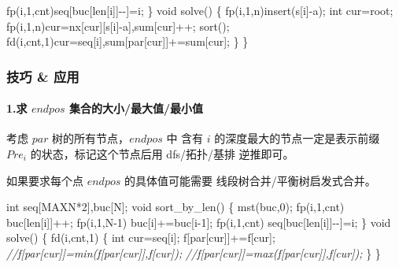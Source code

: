 \documentclass[
]{article}
\newenvironment{Shaded}{}{}
\newcommand{\CharTok}[1]{\textcolor[rgb]{0.25,0.44,0.63}{#1}}
\newcommand{\CommentTok}[1]{\textcolor[rgb]{0.38,0.63,0.69}{\textit{#1}}}
\newcommand{\DataTypeTok}[1]{\textcolor[rgb]{0.56,0.13,0.00}{#1}}
\newcommand{\DecValTok}[1]{\textcolor[rgb]{0.25,0.63,0.44}{#1}}
\newcommand{\NormalTok}[1]{#1}
\begin{document}
\begin{Shaded}
\begin{Highlighting}[]
\NormalTok{        fp(i,}\DecValTok{1}\NormalTok{,cnt)seq[buc[len[i]]{-}{-}]=i;}
\NormalTok{    \}}
    \DataTypeTok{void}\NormalTok{ solve()}
\NormalTok{    \{}
\NormalTok{        fp(i,}\DecValTok{1}\NormalTok{,n)insert(s[i]{-}}\CharTok{\textquotesingle{}a\textquotesingle{}}\NormalTok{);}
        \DataTypeTok{int}\NormalTok{ cur=root;}
\NormalTok{        fp(i,}\DecValTok{1}\NormalTok{,n)cur=nx[cur][s[i]{-}}\CharTok{\textquotesingle{}a\textquotesingle{}}\NormalTok{],sum[cur]++;}
\NormalTok{        sort();}
\NormalTok{        fd(i,cnt,}\DecValTok{1}\NormalTok{)cur=seq[i],sum[par[cur]]+=sum[cur];}
\NormalTok{    \}}
\NormalTok{\}}
\end{Highlighting}
\end{Shaded}

\hypertarget{ux6280ux5de7-ux5e94ux7528}{%
\subsubsection{技巧 \& 应用}\label{ux6280ux5de7-ux5e94ux7528}}

\hypertarget{ux6c42-endpos-ux96c6ux5408ux7684ux5927ux5c0fux6700ux5927ux503cux6700ux5c0fux503c}{%
\paragraph{\texorpdfstring{1.求 \(endpos\)
集合的大小/最大值/最小值}{1.求 endpos 集合的大小/最大值/最小值}}\label{ux6c42-endpos-ux96c6ux5408ux7684ux5927ux5c0fux6700ux5927ux503cux6700ux5c0fux503c}}

考虑 \(par\) 树的所有节点，\(endpos\) 中 含有 \(i\)
的深度最大的节点一定是表示前缀 \(Pre_{i}\) 的状态，标记这个节点后用
dfs/拓扑/基排 逆推即可。

如果要求每个点 \(endpos\) 的具体值可能需要 线段树合并/平衡树启发式合并。

\begin{Shaded}
\begin{Highlighting}[]
\DataTypeTok{int}\NormalTok{ seq[MAXN*}\DecValTok{2}\NormalTok{],buc[N];}
\DataTypeTok{void}\NormalTok{ sort\_by\_len()}
\NormalTok{\{}
\NormalTok{    mst(buc,}\DecValTok{0}\NormalTok{);}
\NormalTok{    fp(i,}\DecValTok{1}\NormalTok{,cnt) buc[len[i]]++;}
\NormalTok{    fp(i,}\DecValTok{1}\NormalTok{,N{-}}\DecValTok{1}\NormalTok{) buc[i]+=buc[i{-}}\DecValTok{1}\NormalTok{];}
\NormalTok{    fp(i,}\DecValTok{1}\NormalTok{,cnt) seq[buc[len[i]]{-}{-}]=i;}
\NormalTok{\}}
\DataTypeTok{void}\NormalTok{ solve()}
\NormalTok{\{}
\NormalTok{    fd(i,cnt,}\DecValTok{1}\NormalTok{)}
\NormalTok{    \{}
        \DataTypeTok{int}\NormalTok{ cur=seq[i];}
\NormalTok{        f[par[cur]]+=f[cur];}
        \CommentTok{//f[par[cur]]=min(f[par[cur]],f[cur]);}
        \CommentTok{//f[par[cur]]=max(f[par[cur]],f[cur]);}
\NormalTok{    \}}
\NormalTok{\}}
\end{Highlighting}
\end{Shaded}
\end{document}
